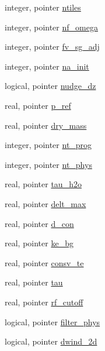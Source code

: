 \begin{DoxyCompactItemize}
\item 
integer, pointer \hyperlink{classfv__control__mod_a03c69dd485bf4db4a1b65e9865ed9360}{ntiles}
\item 
integer, pointer \hyperlink{classfv__control__mod_af5caed647905a5044033d699efb9d678}{nf\-\_\-omega}
\item 
integer, pointer \hyperlink{classfv__control__mod_a8a62e2737bfece356131347ab8bbc19c}{fv\-\_\-sg\-\_\-adj}
\item 
integer, pointer \hyperlink{classfv__control__mod_a8fbe8612bdbe6d72e8790ff88dca41a6}{na\-\_\-init}
\item 
logical, pointer \hyperlink{classfv__control__mod_a8ae39c9f86e291e2d1a3d547c013833a}{nudge\-\_\-dz}
\item 
real, pointer \hyperlink{classfv__control__mod_afde12ac7af6b571a903c1927932582ff}{p\-\_\-ref}
\item 
real, pointer \hyperlink{classfv__control__mod_ae07ac6dea52be935ced1472909778ccb}{dry\-\_\-mass}
\item 
integer, pointer \hyperlink{classfv__control__mod_a41418fcc74203cd7a8a201edb78c1956}{nt\-\_\-prog}
\item 
integer, pointer \hyperlink{classfv__control__mod_a7cdc994b0e188655a7c21504db5e1731}{nt\-\_\-phys}
\item 
real, pointer \hyperlink{classfv__control__mod_a6429af2384662d32d0ac8e8b861f0a31}{tau\-\_\-h2o}
\item 
real, pointer \hyperlink{classfv__control__mod_aa87cabccfecdc02ac2bea4465cd1436f}{delt\-\_\-max}
\item 
real, pointer \hyperlink{classfv__control__mod_a3dcfeda51f7710fa74e8646d9c477dec}{d\-\_\-con}
\item 
real, pointer \hyperlink{classfv__control__mod_aa12a6f639924bcce16aea92d92725f17}{ke\-\_\-bg}
\item 
real, pointer \hyperlink{classfv__control__mod_aea594e5fb2d344f493c621f7d89d8f69}{consv\-\_\-te}
\item 
real, pointer \hyperlink{classfv__control__mod_a9eb0433cb807fe22e9a244bfca40ff21}{tau}
\item 
real, pointer \hyperlink{classfv__control__mod_a2815e52e7b4af1a6e5fa34d99ad9d7cc}{rf\-\_\-cutoff}
\item 
logical, pointer \hyperlink{classfv__control__mod_a09465ea27767a03eabece8b1c3bed623}{filter\-\_\-phys}
\item 
logical, pointer \hyperlink{classfv__control__mod_ac5c21298b6f4836851b6223b2a888906}{dwind\-\_\-2d}
\item 

\end{DoxyCompactItemize}
